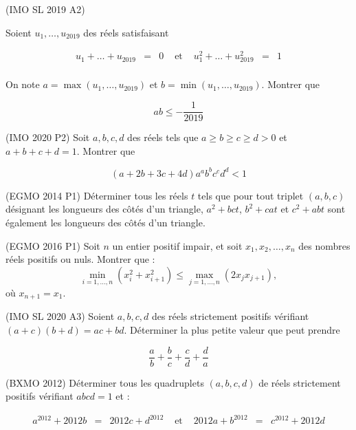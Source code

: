 \begin{exo}
(IMO SL 2019 A2)

Soient $u_1, \ldots , u_{2019}$ des réels satisfaisant

\[\begin{array}{lllllll}
u_1 + \ldots + u_{2019} &=& 0 & \text{ et } & u_1^2+ \ldots + u_{2019}^2 &=& 1 \\
\end{array}\]

On note $a= \max (u_1, \ldots , u_{2019})$ et $b= \min (u_1, \ldots , u_{2019})$. Montrer que

\[ab \leqslant - \frac1{2019}\]
\end{exo}

\begin{exo}
(IMO 2020 P2)
Soit $a,b,c,d$ des réels tels que $a\geqslant b \geqslant c\geqslant d >0$ et $a+b+c+d=1$. Montrer que

\[(a+2b+3c+4d)a^ab^bc^cd^d<1\]

\end{exo}

\begin{exo}
(EGMO 2014 P1)
Déterminer tous les réels $t$ tels que pour tout triplet $(a,b,c)$ désignant les longueurs des côtés d'un triangle, $a^2+bct$, $b^2+cat$ et $c^2+abt$ sont également les longueurs des côtés d'un triangle.
\end{exo}

\begin{exo}
(EGMO 2016 P1)
Soit $n$ un entier positif impair, et soit $x_1,x_2,\dots,x_n$ des nombres réels positifs ou nuls. Montrer que :
\[
\min_{i=1,\dots,n}(x_i^2+x_{i+1}^2) \leq \max_{j=1,\dots,n}(2x_jx_{j+1}),
\]
où $x_{n+1}=x_1$.
\end{exo}


\begin{exo}
(IMO SL 2020 A3)
Soient $a,b,c,d$ des réels strictement positifs vérifiant $(a+c)(b+d)=ac+bd$. Déterminer la plus petite valeur que peut prendre

\[\frac{a}{b}+\frac{b}{c}+\frac{c}{d}+\frac{d}{a}\]
\end{exo}

\begin{exo}
(BXMO 2012)
Déterminer tous les quadruplets $(a,b,c,d)$ de réels strictement positifs vérifiant $abcd=1$ et :

\[\begin{array}{lllllll}
a^{2012}+2012b &=& 2012c+d^{2012} &\text{ et } & 2012a+b^{2012} &=& c^{2012}+2012d\\
\end{array}\]
\end{exo}

